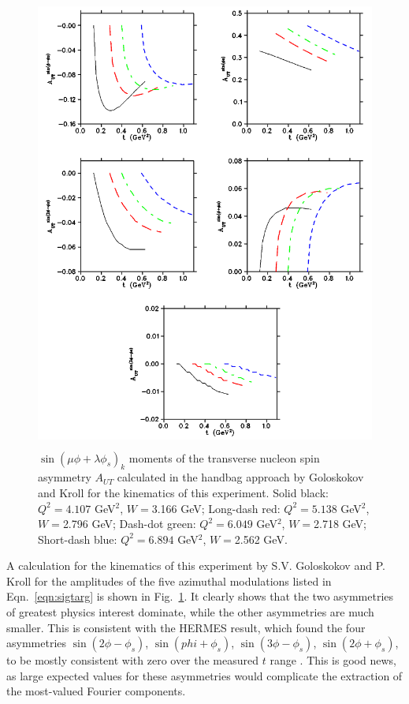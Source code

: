 \begin{figure}[hbt!]
\begin{center}
\includegraphics[height=15cm]{./figures/gk16.png}
\caption{\label{fig:gk16}
\footnotesize{
$\sin(\mu\phi+\lambda\phi_s)_k$ moments of the transverse nucleon spin
  asymmetry $A_{UT}$ calculated in the handbag approach by Goloskokov and Kroll
  \cite{GoPC} for the kinematics of this experiment.
Solid black: $Q^2=4.107$ GeV$^2$, $W=$3.166 GeV;  
Long-dash red: $Q^2=5.138$ GeV$^2$, $W=$2.796 GeV;  
Dash-dot green: $Q^2=6.049$ GeV$^2$, $W=$2.718 GeV;  
Short-dash blue: $Q^2=6.894$ GeV$^2$, $W=$2.562 GeV.}}
\end{center}
\end{figure}

A calculation for the kinematics of this experiment by S.V. Goloskokov and
P. Kroll \cite{Go10,GoPC,Go11} for the amplitudes of the five azimuthal
modulations listed in Eqn.~\ref{eqn:sigtarg} is shown in Fig.~\ref{fig:gk16}.
It clearly shows that the two asymmetries of greatest physics interest
dominate, while the other asymmetries are much smaller.  This is consistent
with the HERMES result, which found the four asymmetries $\sin(2\phi-\phi_s)$, 
$\sin(phi+\phi_s)$, $\sin(3\phi-\phi_s)$, $\sin(2\phi+\phi_s)$, to be mostly
consistent with zero over the measured $t$ range \cite{hermes-thesis}.  This is
good news, as large expected values for these asymmetries would complicate the
extraction of the most-valued Fourier components.

